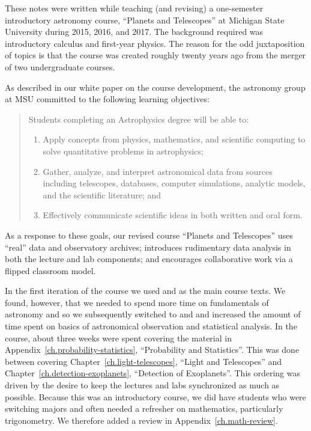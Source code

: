 
These notes were written while teaching (and revising) a one-semester introductory astronomy course, ``Planets and Telescopes'' at Michigan State University during 2015, 2016, and 2017. The background required was  introductory calculus and first-year physics. The reason for the odd juxtaposition of topics is that the course was created roughly twenty years ago from the merger of two undergraduate courses.

As described in our white paper on the course development\cite{BrownDevelopment-of-}, the astronomy group at MSU committed to the following learning objectives:
\begin{quote}
Students completing an Astrophysics degree will be able to:
\begin{enumerate}
\item
Apply concepts from physics, mathematics, and scientific computing to solve quantitative problems in astrophysics;
\item
Gather, analyze, and interpret astronomical data from sources including telescopes, databases, computer simulations, analytic models, and the scientific literature; and
\item
Effectively communicate scientific ideas in both written and oral form.
\end{enumerate}
\end{quote}
As a response to these goals, our revised course ``Planets and Telescopes'' uses ``real'' data and observatory archives; introduces rudimentary data analysis in both the lecture and lab components; and encourages collaborative work via a flipped classroom model.

In the first iteration of the course we used  and  as the main course texts. We found, however, that we needed to spend more time on fundamentals of astronomy and so we subsequently switched to  and  and increased the amount of time spent on basics of astronomical observation and statistical analysis. In the course, about three weeks were spent covering the material in Appendix~\ref{ch.probability-statistics}, ``Probability and Statistics''. This was done between covering Chapter~\ref{ch.light-telescopes}, ``Light and Telescopes'' and Chapter~\ref{ch.detection-exoplanets}, ``Detection of Exoplanets''.  This ordering was driven by the desire to keep the lectures and labs synchronized as much as possible. Because this was an introductory course, we did have students who were switching majors and often needed a refresher on mathematics, particularly trigonometry. We therefore added a review in Appendix~\ref{ch.math-review}.

